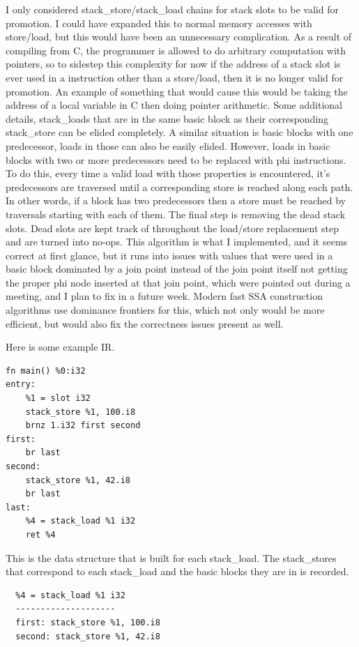 \documentclass[11pt, a4paper, titlepage]{article}
\begin{document}
I only considered stack\_store/stack\_load chains for stack slots to be valid for promotion.
I could have expanded this to normal memory accesses with store/load, but this would have been an unnecessary complication.
As a result of compiling from C, the programmer is allowed to do arbitrary computation with pointers, so to sidestep this complexity for now if the address of a stack slot is ever used in a instruction other than a store/load,
then it is no longer valid for promotion.
An example of something that would cause this would be taking the address of a local variable in C then doing pointer arithmetic.
Some additional details, stack\_loads that are in the same basic block as their corresponding stack\_store can be elided completely.
A similar situation is basic blocks with one predecessor, loads in those can also be easily elided.
However, loads in basic blocks with two or more predecessors need to be replaced with phi instructions.
To do this, every time a valid load with those properties is encountered, it's predecessors are traversed until a corresponding store is reached along each path.
In other words, if a block has two predecessors then a store must be reached by traversals starting with each of them.
The final step is removing the dead stack slots.
Dead slots are kept track of throughout the load/store replacement step and are turned into no-ops.
This algorithm is what I implemented, and it seems correct at first glance, but it runs into issues with values that were used in a basic block dominated by a join point instead of the join point itself not getting the proper phi node inserted at that join point,
which were pointed out during a meeting, and I plan to fix in a future week.
Modern fast SSA construction algorithms use dominance frontiers for this, which not only would be more efficient, but would also fix the correctness issues present as well.

Here is some example IR.

\begin{lstlisting}
fn main() %0:i32
entry:
    %1 = slot i32
    stack_store %1, 100.i8
    brnz 1.i32 first second
first:
    br last
second:
    stack_store %1, 42.i8
    br last
last:
    %4 = stack_load %1 i32
    ret %4
\end{lstlisting}

This is the data structure that is built for each stack\_load.
The stack\_stores that correspond to each stack\_load and the basic blocks they are in is recorded.

\begin{lstlisting}
  %4 = stack_load %1 i32
  --------------------
  first: stack_store %1, 100.i8
  second: stack_store %1, 42.i8
\end{lstlisting}
\end{document}
